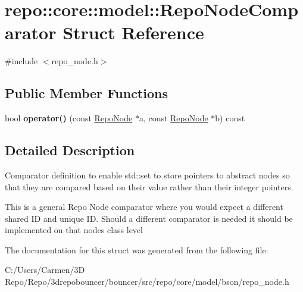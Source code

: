 \hypertarget{structrepo_1_1core_1_1model_1_1_repo_node_comparator}{}\section{repo\+:\+:core\+:\+:model\+:\+:Repo\+Node\+Comparator Struct Reference}
\label{structrepo_1_1core_1_1model_1_1_repo_node_comparator}


{\ttfamily \#include $<$repo\+\_\+node.\+h$>$}

\subsection*{Public Member Functions}
\begin{DoxyCompactItemize}
\item 
\hypertarget{structrepo_1_1core_1_1model_1_1_repo_node_comparator_aee57da2f03675e596c08eaa2fe3c1c93}{}bool {\bfseries operator()} (const \hyperlink{classrepo_1_1core_1_1model_1_1_repo_node}{Repo\+Node} $\ast$a, const \hyperlink{classrepo_1_1core_1_1model_1_1_repo_node}{Repo\+Node} $\ast$b) const \label{structrepo_1_1core_1_1model_1_1_repo_node_comparator_aee57da2f03675e596c08eaa2fe3c1c93}

\end{DoxyCompactItemize}


\subsection{Detailed Description}
Comparator definition to enable std\+::set to store pointers to abstract nodes so that they are compared based on their value rather than their integer pointers.

This is a general Repo Node comparator where you would expect a different shared I\+D and unique I\+D. Should a different comparator is needed it should be implemented on that node\textquotesingle{}s class level 

The documentation for this struct was generated from the following file\+:\begin{DoxyCompactItemize}
\item 
C\+:/\+Users/\+Carmen/3\+D Repo/\+Repo/3drepobouncer/bouncer/src/repo/core/model/bson/repo\+\_\+node.\+h\end{DoxyCompactItemize}
